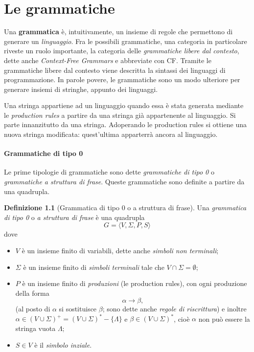 \documentclass[10pt]{\classname}
\theoremstyle{newlinethm}
\theoremstyle{theorem}
\theoremstyle{definition}
\newtheorem{definizione}{Definizione}[section]
\theoremstyle{definition}
\theoremstyle{definition}
\theoremstyle{definition}
\begin{document}
\clearpage

\chapter{Le grammatiche}

Una \textbf{grammatica} è, intuitivamente, un insieme di regole che permettono
di generare un \emph{linguaggio}. Fra le possibili grammatiche, una categoria
in particolare riveste un ruolo importante, la categoria delle
\emph{grammatiche libere dal contesto}, dette anche \emph{Context-Free
Grammars} e abbreviate con CF. Tramite le grammatiche libere dal contesto viene
descritta la sintassi dei linguaggi di programmazione. In parole povere, le
grammatiche sono un modo ulteriore per generare insiemi di stringhe, appunto
dei linguaggi.

Una stringa appartiene ad un linguaggio quando essa è stata generata mediante
le \emph{production rules} a partire da una stringa già appartenente al
linguaggio. Si parte innanzitutto da una stringa. Adoperando le production
rules si ottiene una nuova stringa modificata: quest'ultima apparterrà ancora
al linguaggio.

\subsubsection{Grammatiche di tipo 0}

Le prime tipologie di grammatiche sono dette \emph{grammatiche di tipo 0} o
\emph{grammatiche a struttura di frase}. Queste grammatiche sono definite a
partire da una quadrupla. 

\begin{definizione}[Grammatica di tipo 0 o a struttura di frase] Una \emph{grammatica di tipo 0} o \emph{a struttura di frase} è una quadrupla $$G = \langle V, \Sigma, P, S\rangle$$ dove 
\begin{itemize}
    \item $V$ è un insieme finito di variabili, dette anche \emph{simboli non terminali}; 
    \item $\Sigma$ è un insieme finito di \emph{simboli terminali} tale che $V \cap \Sigma =
\emptyset$; 
    \item $P$ è un insieme finito di \emph{produzioni} (le production rules), con ogni produzione della forma $$\alpha \rightarrow \beta,$$ (al posto di $\alpha$ si sostituisce $\beta$; sono dette anche \emph{regole di riscrittura}) e inoltre $\alpha \in (V \cup \Sigma)^+ = (V \cup \Sigma)^* - \{\Lambda\}$ e $\beta \in (V \cup \Sigma)^*$, cioè $\alpha$ non può essere la stringa vuota $\Lambda$;
    \item $S \in V$ è il \emph{simbolo inziale}.
\end{itemize}
\end{definizione}
\end{document}
